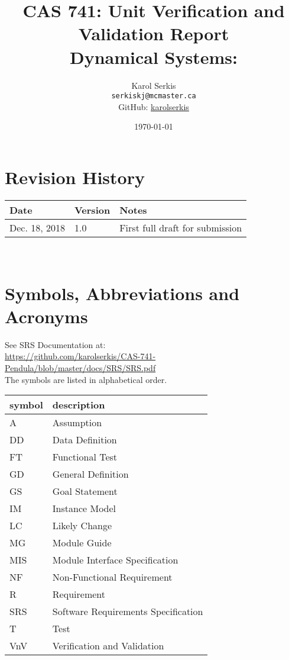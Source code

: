 \documentclass[12pt, titlepage]{article}
\begin{document}
\title{CAS 741: Unit Verification and Validation Report\\[10pt]
\Large Dynamical Systems: \progname}
\author{Karol Serkis\\\texttt{serkiskj@mcmaster.ca}\\GitHub:
\href{https://www.github.com/karolserkis}{karolserkis}}
\date{\today}
	
\maketitle


\section{Revision History}

\begin{tabularx}{\textwidth}{p{3cm}p{2cm}X}
\toprule {\bf Date} & {\bf Version} & {\bf Notes}\\
\midrule
Dec. 18, 2018 & 1.0 &  First full draft for submission\\
\bottomrule
\end{tabularx}

~\newpage


\section{Symbols, Abbreviations and Acronyms}

See SRS Documentation at:\\
\url{https://github.com/karolserkis/CAS-741-Pendula/blob/master/docs/SRS/SRS.pdf}\\
The symbols are listed in alphabetical order.\\

\renewcommand{\arraystretch}{1.2}
\begin{tabular}{l l} 
  \toprule		
  \textbf{symbol} & \textbf{description}\\
  \midrule 
  A & Assumption\\
  DD & Data Definition\\
  FT & Functional Test \\
  GD & General Definition\\
  GS & Goal Statement\\
  IM & Instance Model\\
  LC & Likely Change\\
  MG & Module Guide\\ 
  MIS & Module Interface Specification\\ 
  NF & Non-Functional Requirement\\
  R & Requirement\\
  SRS & Software Requirements Specification\\
  T & Test\\
  VnV & Verification and Validation\\ 
  \bottomrule
\end{tabular}\\
\end{document}

